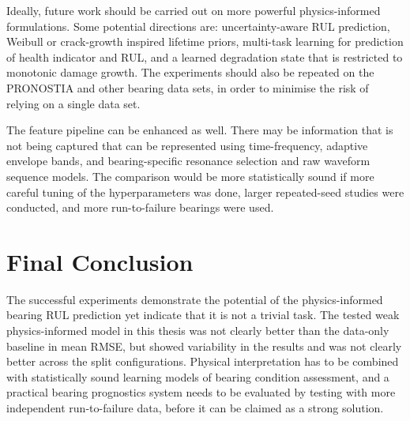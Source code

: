 Ideally, future work should be carried out on more powerful physics-informed formulations. Some potential directions are: uncertainty-aware RUL prediction, Weibull or crack-growth inspired lifetime priors, multi-task learning for prediction of health indicator and RUL, and a learned degradation state that is restricted to monotonic damage growth. The experiments should also be repeated on the PRONOSTIA and other bearing data sets, in order to minimise the risk of relying on a single data set.

The feature pipeline can be enhanced as well. There may be information that is not being captured that can be represented using time-frequency, adaptive envelope bands, and bearing-specific resonance selection and raw waveform sequence models. The comparison would be more statistically sound if more careful tuning of the hyperparameters was done, larger repeated-seed studies were conducted, and more run-to-failure bearings were used.

\section{Final Conclusion}

The successful experiments demonstrate the potential of the physics-informed bearing RUL prediction yet indicate that it is not a trivial task. The tested weak physics-informed model in this thesis was not clearly better than the data-only baseline in mean RMSE, but showed variability in the results and was not clearly better across the split configurations. Physical interpretation has to be combined with statistically sound learning models of bearing condition assessment, and a practical bearing prognostics system needs to be evaluated by testing with more independent run-to-failure data, before it can be claimed as a strong solution.
